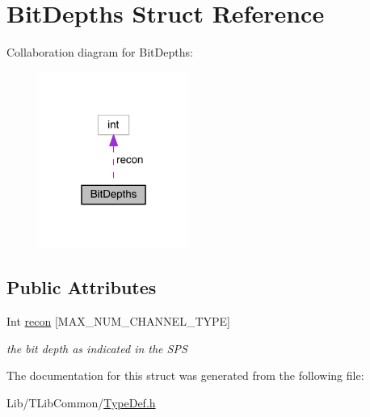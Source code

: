 \hypertarget{struct_bit_depths}{}\section{Bit\+Depths Struct Reference}
\label{struct_bit_depths}


Collaboration diagram for Bit\+Depths\+:
\nopagebreak
\begin{figure}[H]
\begin{center}
\leavevmode
\includegraphics[width=139pt]{dd/d7e/struct_bit_depths__coll__graph}
\end{center}
\end{figure}
\subsection*{Public Attributes}
\begin{DoxyCompactItemize}
\item 
\mbox{\label{struct_bit_depths_ab96fb4630b7c08f91c84d072240ef6ea}} 
Int \hyperlink{struct_bit_depths_ab96fb4630b7c08f91c84d072240ef6ea}{recon} \mbox{[}M\+A\+X\+\_\+\+N\+U\+M\+\_\+\+C\+H\+A\+N\+N\+E\+L\+\_\+\+T\+Y\+PE\mbox{]}
\begin{DoxyCompactList}\small\item\em the bit depth as indicated in the S\+PS \end{DoxyCompactList}\end{DoxyCompactItemize}


The documentation for this struct was generated from the following file\+:\begin{DoxyCompactItemize}
\item 
Lib/\+T\+Lib\+Common/\hyperlink{_type_def_8h}{Type\+Def.\+h}\end{DoxyCompactItemize}
